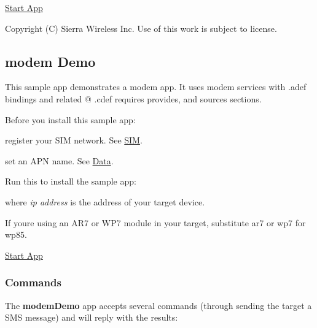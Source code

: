 \hyperlink{sample_apps_sampleApps_startApp}{Start App}





Copyright (C) Sierra Wireless Inc. Use of this work is subject to license. \hypertarget{sampleApps_modemDemo}{}\subsection{modem Demo}\label{sampleApps_modemDemo}
This sample app demonstrates a modem app. It uses modem services with {\ttfamily }.adef bindings and related @ .cdef requires provides, and sources sections.

Before you install this sample app\+:
\begin{DoxyItemize}
\item register your S\+I\+M network. See \hyperlink{tools_target_cm_toolsTarget_cm_sim}{S\+I\+M}.
\item set an A\+P\+N name. See \hyperlink{tools_target_cm_toolsTarget_cm_data}{Data}.
\end{DoxyItemize}

Run this to install the sample app\+:



where {\itshape ip address} is the address of your target device.

If you\textquotesingle{}re using an A\+R7 or W\+P7 module in your target, substitute {\ttfamily ar7} or {\ttfamily wp7} for {\ttfamily wp85}.

\hyperlink{sample_apps_sampleApps_startApp}{Start App}\hypertarget{sample_apps_modem_demo_sampleApps_modemDemoCmds}{}\subsubsection{Commands}\label{sample_apps_modem_demo_sampleApps_modemDemoCmds}
The {\bfseries modem\+Demo} app accepts several commands (through sending the target a S\+M\+S message) and will reply with the results\+:


